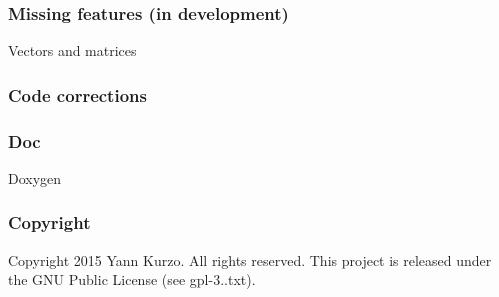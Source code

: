 \subsubsection*{Missing features (in development)}


\begin{DoxyItemize}
\item Vectors and matrices
\end{DoxyItemize}

\subsubsection*{Code corrections}

\subsubsection*{Doc}


\begin{DoxyItemize}
\item Doxygen
\end{DoxyItemize}

\subsubsection*{Copyright}

Copyright 2015 Yann Kurzo. All rights reserved. This project is released under the G\+N\+U Public License (see gpl-\/3..\+txt). 